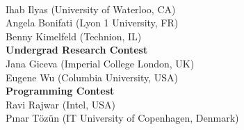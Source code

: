 {\\ Ihab Ilyas \textsf{\footnotesize(University of Waterloo, CA)}
\\ Angela Bonifati \textsf{\footnotesize(Lyon 1 University, FR)}
\\ Benny Kimelfeld \textsf{\footnotesize(Technion, IL)}
\\[2.4ex]
\textbf{Undergrad Research Contest}
\\ Jana Giceva \textsf{\footnotesize(Imperial College London, UK)}
\\ Eugene Wu \textsf{\footnotesize(Columbia University, USA)}
\\[2.4ex]
\textbf{Programming Contest}
\\ Ravi Rajwar \textsf{\footnotesize(Intel, USA)}
\\ Pınar Tözün \textsf{\footnotesize(IT University of Copenhagen, Denmark)}

}
